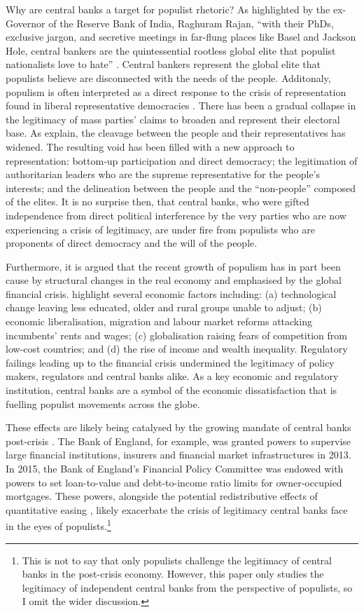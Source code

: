\documentclass[11pt]{article}
\begin{document}
Why are central banks a target for populist rhetoric? As highlighted by the ex-Governor of the Reserve Bank of India, Raghuram Rajan, ``with their PhDs, exclusive jargon, and secretive meetings in far-flung places like Basel and Jackson Hole, central bankers are the quintessential rootless global elite that populist nationalists love to hate'' \citep{rajan2017central}. Central bankers represent the global elite that populists believe are disconnected with the needs of the people. Additonaly, populism is often interpreted as a direct response to the crisis of representation found in liberal representative democracies \citep{de2018populism}. There has been a gradual collapse in the legitimacy of mass parties' claims to broaden and represent their electoral base.  As \cite{de2018populism} explain, the cleavage between the people and their representatives has widened. The resulting void has been filled with a new approach to representation: bottom-up participation and direct democracy; the legitimation of authoritarian leaders who are the supreme representative for the people's interests; and the delineation between the people and the ``non-people'' composed of the elites. It is no surprise then, that central banks, who were gifted independence from direct political interference by the very parties who are now experiencing a crisis of legitimacy, are under fire from populists who are proponents of direct democracy and the will of the people. 

Furthermore, it is argued that the recent growth of populism has in part been cause by structural changes in the real economy and emphasised by the global financial crisis. \citep{gnan2020populism} highlight several economic factors including: (a) technological change leaving less educated, older and rural groups unable to adjust; (b) economic liberalisation, migration and labour market reforms attacking incumbents’ rents and wages; (c) globalisation raising fears of competition from low-cost countries; and (d) the rise of income and wealth inequality. Regulatory failings leading up to the financial crisis \citep{turner12017did} undermined the legitimacy of policy makers, regulators and central banks alike. As a key economic and regulatory institution, central banks are a symbol of the economic dissatisfaction that is fuelling populist movements across the globe. 

These effects are likely being catalysed by the growing mandate of central banks post-crisis \citep{goodhart2018populism}. The Bank of England, for example, was granted powers to supervise large financial institutions, insurers and financial market infrastructures in 2013. In 2015, the Bank of England's Financial Policy Committee was endowed with powers to set loan-to-value and debt-to-income ratio limits for owner-occupied mortgages. These powers, alongside the potential redistributive effects of quantitative easing \citep{mumtaz2017impact}, likely exacerbate the crisis of legitimacy central banks face in the eyes of populists.\footnote{This is not to say that only populists challenge the legitimacy of central banks in the post-crisis economy. However, this paper only studies the legitimacy of independent central banks from the perspective of populists, so I omit the wider discussion.}
\end{document}
